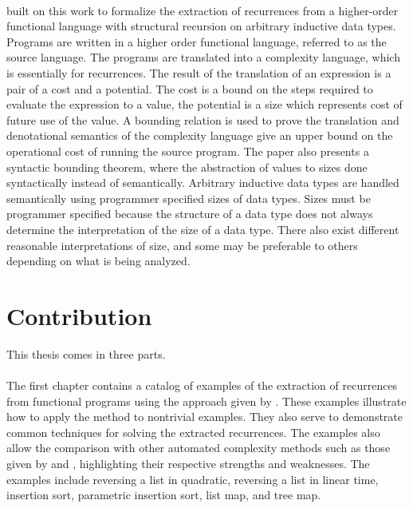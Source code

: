 \paragraph{}
\citet{Danner2015} built on this work to formalize the extraction
of recurrences from a higher-order functional language with structural
recursion on arbitrary inductive data types. Programs are written in a higher
order functional language, referred to as the source language. The programs are
translated into a complexity language, which is essentially for recurrences.
The result of the translation of an expression is a pair of a cost and a
potential. The cost is a bound on the steps required to evaluate the expression
to a value, the potential is a size which represents cost of future use of the
value. A bounding relation is used to prove the translation and denotational
semantics of the complexity language give an upper bound on the operational
cost of running the source program. The paper also presents a syntactic
bounding theorem, where the abstraction of values to sizes done syntactically
instead of semantically.  Arbitrary inductive data types are handled
semantically using programmer specified sizes of data types. Sizes must be
programmer specified because the structure of a data type does not always
determine the interpretation of the size of a data type. There also exist
different reasonable interpretations of size, and some may be preferable to
others depending on what is being analyzed.


\section{Contribution}

This thesis comes in three parts.
\paragraph{}
The first chapter contains a catalog of examples of the extraction of recurrences
from functional programs using the approach given by \citet{Danner2015}. These
examples illustrate how to apply the method to nontrivial examples. They also
serve to demonstrate common techniques for solving the extracted recurrences.
The examples also allow the comparison with other automated complexity methods
such as those given by \citet{Avanzini2015} and \citet{HoffHof2010},
highlighting their respective strengths and weaknesses. The examples include
reversing a list in quadratic, reversing a list in linear time, insertion sort,
parametric insertion sort, list map, and tree map.


